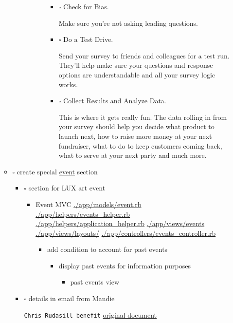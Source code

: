 \documentclass[11pt]{article}
\begin{document}
\begin{itemize}
\begin{itemize}
\begin{itemize}
\begin{itemize}
\begin{itemize}
\begin{itemize}
\item $\square$ Check for Bias. 

Make sure you're not asking leading questions.

\item $\square$ Do a Test Drive. 

Send your survey to friends and colleagues for a test run. 
They'll help make sure your questions and response options are 
understandable and all your survey logic works.

\item $\square$ Collect Results and Analyze Data. 

This is where it gets really fun. The data rolling in from your 
survey should help you decide what product to launch next, how 
to raise more money at your next fundraiser, what to do to keep 
customers coming back, what to serve at your next party and much 
more.
\end{itemize}
\end{itemize}
\end{itemize}
\end{itemize}
\item $\square$ create special \hyperref[sec-1-3]{event} section
\begin{itemize}
\item $\square$ section for LUX art event
\begin{itemize}
\item Event MVC
\url{./app/models/event.rb}
\url{./app/helpers/events_helper.rb}
\url{./app/helpers/application_helper.rb}
\url{./app/views/events}
\url{./app/views/layouts/}
\url{./app/controllers/events_controller.rb}

\begin{itemize}
\item add condition to account for past events
\begin{itemize}
\item display past events for information purposes
\begin{itemize}
\item past events view
\end{itemize}
\end{itemize}
\end{itemize}
\end{itemize}
\item $\square$ details in email from Mandie

\texttt{Chris Rudasill benefit}
\href{docs/ArtAuctionbyChrisRudasilltobenifittPrairieHill.docx.txt}{original document}


\end{itemize}
\end{itemize}
\end{itemize}
\end{document}

